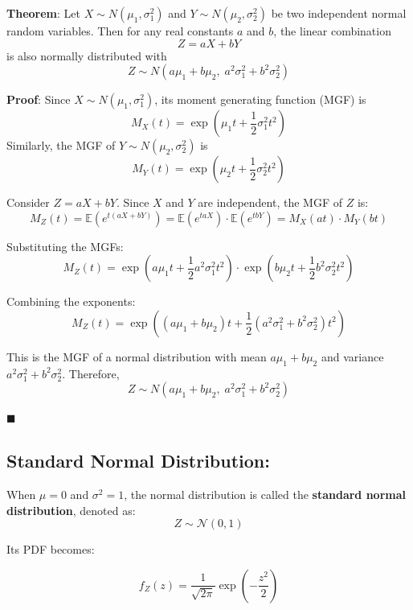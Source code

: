 \documentclass[twoside]{book}
\begin{document}
\begin{enumerate}
	\begin{textbox}
		\textbf{Theorem}: Let \( X \sim N(\mu_1, \sigma_1^2) \) and \( Y \sim N(\mu_2, \sigma_2^2) \) be two independent normal random variables. Then for any real constants \( a \) and \( b \), the linear combination
		\[
		Z = aX + bY
		\]
		is also normally distributed with
		\[
		Z \sim N\left( a\mu_1 + b\mu_2,\; a^2 \sigma_1^2 + b^2 \sigma_2^2 \right)
		\]
	\end{textbox}

	\textbf{Proof}: Since \( X \sim N(\mu_1, \sigma_1^2) \), its moment generating function (MGF) is
		\[
		M_X(t) = \exp\left( \mu_1 t + \frac{1}{2} \sigma_1^2 t^2 \right)
		\]
		Similarly, the MGF of \( Y \sim N(\mu_2, \sigma_2^2) \) is
		\[
		M_Y(t) = \exp\left( \mu_2 t + \frac{1}{2} \sigma_2^2 t^2 \right)
		\]

		Consider \( Z = aX + bY \). Since \( X \) and \( Y \) are independent, the MGF of \( Z \) is:
		\[
		M_Z(t) = \mathbb{E}\left( e^{t(aX + bY)}\right)  = \mathbb{E}\left( e^{taX}\right)  \cdot \mathbb{E}\left( e^{tbY}\right)  = M_X(at) \cdot M_Y(bt)
		\]

		Substituting the MGFs:
		\[
		M_Z(t) = \exp\left( a\mu_1 t + \frac{1}{2} a^2 \sigma_1^2 t^2 \right) \cdot \exp\left( b\mu_2 t + \frac{1}{2} b^2 \sigma_2^2 t^2 \right)
		\]

		Combining the exponents:
		\[
		M_Z(t) = \exp\left( (a\mu_1 + b\mu_2)t + \frac{1}{2}(a^2 \sigma_1^2 + b^2 \sigma_2^2)t^2 \right)
		\]

		This is the MGF of a normal distribution with mean \( a\mu_1 + b\mu_2 \) and variance \( a^2 \sigma_1^2 + b^2 \sigma_2^2 \). Therefore,
		\[
		Z \sim N\left( a\mu_1 + b\mu_2,\; a^2 \sigma_1^2 + b^2 \sigma_2^2 \right)
		\]

		\hfill $\blacksquare$


\end{enumerate}



\subsection{Standard Normal Distribution:}

When $\mu = 0$ and $\sigma^2 = 1$, the normal distribution is called the \textbf{standard normal distribution}, denoted as:
\[
Z \sim \mathcal{N}(0, 1)
\]

Its PDF becomes:
\begin{textbox}
\[
f_Z(z) = \frac{1}{\sqrt{2\pi}} \exp\left( -\frac{z^2}{2} \right)
\]
\end{textbox}
\end{document}

